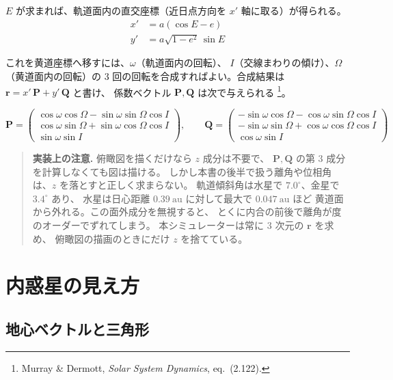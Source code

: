 \documentclass[a4paper,11pt]{ltjsarticle}
\newcommand{\vek}[1]{\boldsymbol{#1}}
\begin{document}
$E$ が求まれば、軌道面内の直交座標（近日点方向を $x'$ 軸に取る）が得られる。
\begin{align}
  x' &= a(\cos E - e)\\
  y' &= a\sqrt{1-e^2}\,\sin E
\end{align}

これを黄道座標へ移すには、$\omega$（軌道面内の回転）、
$I$（交線まわりの傾け）、$\Omega$（黄道面内の回転）の
3 回の回転を合成すればよい。合成結果は
$\vek{r} = x'\,\vek{P} + y'\,\vek{Q}$ と書け、
係数ベクトル $\vek{P}, \vek{Q}$ は次で与えられる
\footnote{Murray \& Dermott, \emph{Solar System Dynamics}, eq.~(2.122).}。

\begin{equation}
  \vek{P} =
  \begin{pmatrix}
    \cos\omega\cos\Omega - \sin\omega\sin\Omega\cos I\\
    \cos\omega\sin\Omega + \sin\omega\cos\Omega\cos I\\
    \sin\omega\sin I
  \end{pmatrix},
  \qquad
  \vek{Q} =
  \begin{pmatrix}
    -\sin\omega\cos\Omega - \cos\omega\sin\Omega\cos I\\
    -\sin\omega\sin\Omega + \cos\omega\cos\Omega\cos I\\
    \cos\omega\sin I
  \end{pmatrix}
  \label{eq:PQ}
\end{equation}

\begin{quote}\small
\textbf{実装上の注意.}
俯瞰図を描くだけなら $z$ 成分は不要で、
$\vek{P}, \vek{Q}$ の第 3 成分を計算しなくても図は描ける。
しかし本書の後半で扱う離角や位相角は、$z$ を落とすと正しく求まらない。
軌道傾斜角は水星で $7.0^\circ$、金星で $3.4^\circ$ あり、
水星は日心距離 $0.39\ \mathrm{au}$ に対して最大で $0.047\ \mathrm{au}$ ほど
黄道面から外れる。この面外成分を無視すると、
とくに内合の前後で離角が度のオーダーでずれてしまう。
本シミュレーターは常に 3 次元の $\vek{r}$ を求め、
俯瞰図の描画のときにだけ $z$ を捨てている。
\end{quote}

\section{内惑星の見え方}
\label{sec:appearance}

\subsection{地心ベクトルと三角形}
\end{document}
